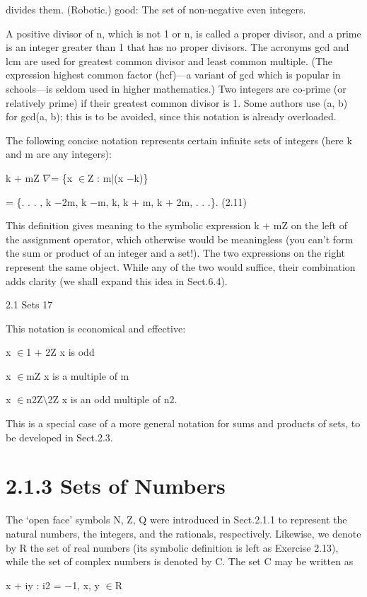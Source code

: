 \documentclass[11pt]{article}
\theoremstyle{plain}
\theoremstyle{definition}
\begin{document}
divides them. (Robotic.) good: The set of non-negative even integers.

A positive divisor of n, which is not 1 or n, is called a proper divisor, and a prime is an integer greater than 1 that has no proper divisors. The acronyms gcd and lcm are used for greatest common divisor and least common multiple. (The expression highest common factor (hcf)---a variant of gcd which is popular in schools---is seldom used in higher mathematics.) Two integers are co-prime (or relatively prime) if their greatest common divisor is 1. Some authors use (a, b) for gcd(a, b); this is to be avoided, since this notation is already overloaded.

The following concise notation represents certain infinite sets of integers (here k and m are any integers):

k + mZ $\nabla$= \{x $\in$Z : m|(x $-$k)\}

= \{. . . , k $-$2m, k $-$m, k, k + m, k + 2m, . . .\}. (2.11)

This definition gives meaning to the symbolic expression k + mZ on the left of the assignment operator, which otherwise would be meaningless (you can't form the sum or product of an integer and a set!). The two expressions on the right represent the same object. While any of the two would suffice, their combination adds clarity (we shall expand this idea in Sect.6.4).

2.1 Sets 17

This notation is economical and effective:

x $\in$1 + 2Z x is odd

x $\in$mZ x is a multiple of m

x $\in$n2Z$\setminus$2Z x is an odd multiple of n2.

This is a special case of a more general notation for sums and products of sets, to be developed in Sect.2.3.

\section{2.1.3 Sets of Numbers}

The `open face' symbols N, Z, Q were introduced in Sect.2.1.1 to represent the natural numbers, the integers, and the rationals, respectively. Likewise, we denote by R the set of real numbers (its symbolic definition is left as Exercise 2.13), while the set of complex numbers is denoted by C. The set C may be written as

x + iy : i2 = $-$1, x, y $\in$R
\end{document}
